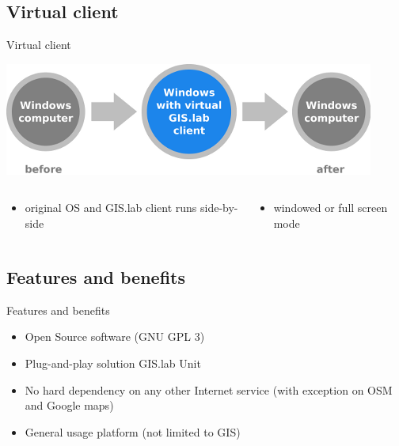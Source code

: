 \documentclass[12pt]{beamer}
\begin{document}
\subsection{Virtual client}
\begin{frame}{Virtual client}
	\begin{center}
		\includegraphics[keepaspectratio=true,height=0.3\textheight]{images/schema-virtual-client.png}
	\end{center}
	\begin{columns}
		\begin{column}{0.5\textwidth}
			\begin{itemize}
				\item original OS and GIS.lab client runs side-by-side 
			\end{itemize}				
    	\end{column}
		\begin{column}{0.5\textwidth}
			\begin{itemize}
				\item windowed or full screen mode
			\end{itemize}
		\end{column}
	\end{columns}	
\end{frame}


\subsection{Features and benefits}
\begin{frame}{Features and benefits}
	\begin{itemize}
		\item Open Source software (GNU GPL 3)
		\item Plug-and-play solution GIS.lab Unit
		\item No hard dependency on any other Internet service (with exception on OSM and Google maps)
		\item General usage platform (not limited to GIS)
	\end{itemize}
\end{frame}
\end{document}
